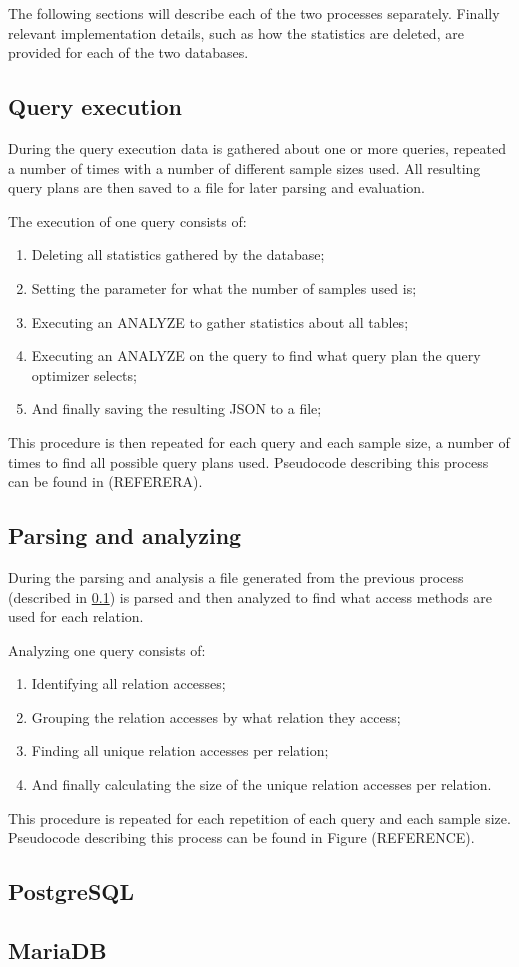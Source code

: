 The following sections will describe each of the two processes separately.
Finally relevant implementation details, such as how the statistics are deleted,
are provided for each of the two databases.

\subsection{Query execution} \label{sec:queryexecution}
During the query execution data is gathered about one or more queries, repeated
a number of times with a number of different sample sizes used. All resulting
query plans are then saved to a file for later parsing and evaluation.

The execution of one query consists of:
\begin{enumerate}
\item Deleting all statistics gathered by the database;
\item Setting the parameter for what the number of samples used is;
\item Executing an ANALYZE to gather statistics about all tables;
\item Executing an ANALYZE on the query to find what query plan the query
  optimizer selects;
\item And finally saving the resulting JSON to a file;
\end{enumerate}

This procedure is then repeated for each query and each sample size, a number of
times to find all possible query plans used. Pseudocode describing this process
can be found in (REFERERA).

\subsection{Parsing and analyzing} \label{sec:parsing}
During the parsing and analysis a file generated from the previous process
(described in \ref{sec:queryexecution}) is parsed and then analyzed to find what
access methods are used for each relation.

Analyzing one query consists of:
\begin{enumerate}
\item Identifying all relation accesses;
\item Grouping the relation accesses by what relation they access;
\item Finding all unique relation accesses per relation;
\item And finally calculating the size of the unique relation accesses per relation.
\end{enumerate}

This procedure is repeated for each repetition of each query and each sample
size. Pseudocode describing this process can be found in Figure (REFERENCE).

\subsection{PostgreSQL}

\subsection{MariaDB}
